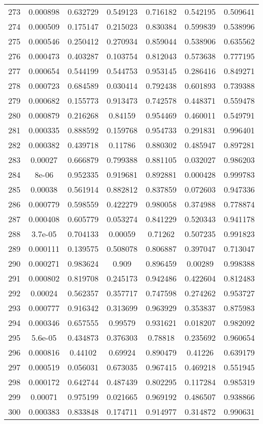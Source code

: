 \begin{table}
\begin{tabular}{c|c|c|c|c|c|c}
273 & 0.000898 & 0.632729 & 0.549123 & 0.716182 & 0.542195 & 0.509641\\
274 & 0.000509 & 0.175147 & 0.215023 & 0.830384 & 0.599839 & 0.538996\\
275 & 0.000546 & 0.250412 & 0.270934 & 0.859044 & 0.538906 & 0.635562\\
276 & 0.000473 & 0.403287 & 0.103754 & 0.812043 & 0.573638 & 0.777195\\
277 & 0.000654 & 0.544199 & 0.544753 & 0.953145 & 0.286416 & 0.849271\\
278 & 0.000723 & 0.684589 & 0.030414 & 0.792438 & 0.601893 & 0.739388\\
279 & 0.000682 & 0.155773 & 0.913473 & 0.742578 & 0.448371 & 0.559478\\
280 & 0.000879 & 0.216268 & 0.84159 & 0.954469 & 0.460011 & 0.549791\\
281 & 0.000335 & 0.888592 & 0.159768 & 0.954733 & 0.291831 & 0.996401\\
282 & 0.000382 & 0.439718 & 0.11786 & 0.880302 & 0.485947 & 0.897281\\
283 & 0.00027 & 0.666879 & 0.799388 & 0.881105 & 0.032027 & 0.986203\\
284 & 8e-06 & 0.952335 & 0.919681 & 0.892881 & 0.000428 & 0.999783\\
285 & 0.00038 & 0.561914 & 0.882812 & 0.837859 & 0.072603 & 0.947336\\
286 & 0.000779 & 0.598559 & 0.422279 & 0.980058 & 0.374988 & 0.778874\\
287 & 0.000408 & 0.605779 & 0.053274 & 0.841229 & 0.520343 & 0.941178\\
288 & 3.7e-05 & 0.704133 & 0.00059 & 0.71262 & 0.507235 & 0.991823\\
289 & 0.000111 & 0.139575 & 0.508078 & 0.806887 & 0.397047 & 0.713047\\
290 & 0.000271 & 0.983624 & 0.909 & 0.896459 & 0.00289 & 0.998388\\
291 & 0.000802 & 0.819708 & 0.245173 & 0.942486 & 0.422604 & 0.812483\\
292 & 0.00024 & 0.562357 & 0.357717 & 0.747598 & 0.274262 & 0.953727\\
293 & 0.000777 & 0.916342 & 0.313699 & 0.963929 & 0.353837 & 0.875983\\
294 & 0.000346 & 0.657555 & 0.99579 & 0.931621 & 0.018207 & 0.982092\\
295 & 5.6e-05 & 0.434873 & 0.376303 & 0.78818 & 0.235692 & 0.960654\\
296 & 0.000816 & 0.44102 & 0.69924 & 0.890479 & 0.41226 & 0.639179\\
297 & 0.000519 & 0.056031 & 0.673035 & 0.967415 & 0.469218 & 0.551945\\
298 & 0.000172 & 0.642744 & 0.487439 & 0.802295 & 0.117284 & 0.985319\\
299 & 0.00071 & 0.975199 & 0.021665 & 0.969192 & 0.486507 & 0.938866\\
300 & 0.000383 & 0.833848 & 0.174711 & 0.914977 & 0.314872 & 0.990631\\
\end{tabular}
\end{table}
